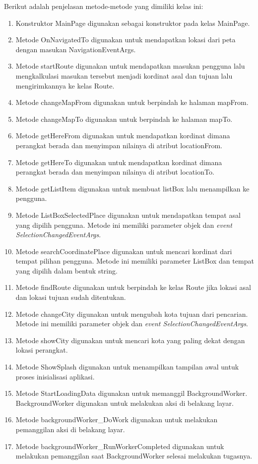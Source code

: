 Berikut adalah penjelasan metode-metode yang dimiliki kelas ini:
\begin{enumerate}
	\item Konstruktor MainPage digunakan sebagai konstruktor pada kelas MainPage.
	\item Metode OnNavigatedTo digunakan untuk mendapatkan lokasi dari peta dengan masukan NavigationEventArgs.
	\item Metode startRoute digunakan untuk mendapatkan masukan pengguna lalu mengkalkulasi masukan tersebut menjadi kordinat asal dan tujuan lalu mengirimkannya ke kelas Route.
	\item Metode changeMapFrom digunakan untuk berpindah ke halaman mapFrom.
	\item Metode changeMapTo digunakan untuk berpindah ke halaman mapTo.
	\item Metode getHereFrom digunakan untuk mendapatkan kordinat dimana perangkat berada dan menyimpan nilainya di atribut locationFrom.
	\item Metode getHereTo digunakan untuk mendapatkan kordinat dimana perangkat berada dan menyimpan nilainya di atribut locationTo.
	\item Metode getListItem digunakan untuk membuat listBox lalu menampilkan ke pengguna. 
	\item Metode ListBoxSelectedPlace digunakan untuk mendapatkan tempat asal yang dipilih pengguna. Metode ini memiliki parameter objek dan \textit{event SelectionChangedEventArgs}. 
	\item Metode searchCoordinatePlace digunakan untuk mencari kordinat dari tempat pilihan pengguna. Metode ini memiliki parameter ListBox dan tempat yang dipilih dalam bentuk string.
	\item Metode findRoute digunakan untuk berpindah ke kelas Route jika lokasi asal dan lokasi tujuan sudah ditentukan.
	\item Metode changeCity digunakan untuk mengubah kota tujuan dari pencarian. Metode ini memiliki parameter objek dan \textit{event SelectionChangedEventArgs}.
	\item Metode showCity digunakan untuk mencari kota yang paling dekat dengan lokasi perangkat.
	\item Metode ShowSplash digunakan untuk menampilkan tampilan awal untuk proses inisialisasi aplikasi.
	\item Metode StartLoadingData digunakan untuk memanggil BackgroundWorker. BackgroundWorker digunakan untuk melakukan aksi di belakang layar.
	\item Metode backgroundWorker\_DoWork digunakan untuk melakukan pemanggilan aksi di belakang layar.
	\item Metode backgroundWorker\_RunWorkerCompleted digunakan untuk melakukan pemanggilan saat BackgroundWorker selesai melakukan tugasnya.
\end{enumerate}

